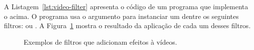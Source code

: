 A Listagem~\ref{lst:video-filter} apresenta o código de um programa que
implementa o  acima. O programa usa o argumento  para
instanciar um dentre os seguintes filtros:
 ou .
A Figura~\ref{fig:video-filter} mostra o resultado da aplicação de cada um
desses filtros.



\begin{figure}[h!]
  \centering
  \caption{Exemplos de filtros que adicionam efeitos à vídeos.}
  \label{fig:video-filter}
\end{figure}
